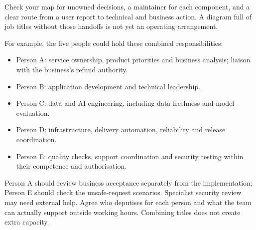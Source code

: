 Check your map for unowned decisions, a maintainer for each component, and a clear route from a user report to technical and business action. A diagram full of job titles without those handoffs is not yet an operating arrangement.



For example, the five people could hold these combined responsibilities:


\begin{itemize}[leftmargin=*]
\item Person A: service ownership, product priorities and business analysis; liaison with the business's refund authority.
\item Person B: application development and technical leadership.
\item Person C: data and AI engineering, including data freshness and model evaluation.
\item Person D: infrastructure, delivery automation, reliability and release coordination.
\item Person E: quality checks, support coordination and security testing within their competence and authorisation.
\end{itemize}

Person A should review business acceptance separately from the implementation; Person E should check the unsafe-request scenarios. Specialist security review may need external help. Agree who deputises for each person and what the team can actually support outside working hours. Combining titles does not create extra capacity.
